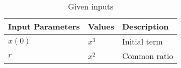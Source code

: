 \begin{table}[htbp]
\centering
\def\arraystrech{1.5}
	\begin{tabular}{|p{2.5cm}|p{1.5cm}|p{3cm}|}
\hline
		\textbf{Input Parameters} & \textbf{Values} & \textbf{Description} \\
\hline
		$x(0)$ & $x^3$ & Initial term\\
\hline
		$r$ & $x^2$ & Common ratio\\
\hline
\end{tabular}
\caption{Given inputs}
\label{tab:1.11.9.3.Q10}
\end{table}
